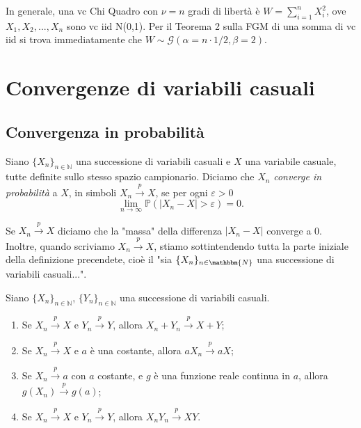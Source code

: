 In generale, una vc Chi Quadro con $\nu=n$ gradi di libertà è $W=\sum_{i=1}^n X_i^2$, ove $X_1,X_2,...,X_n$ sono vc iid N(0,1). Per il Teorema 2 sulla FGM di una somma di vc iid si trova immediatamente che $W \sim \mathcal{G}(\alpha=n \cdot 1/2,\beta=2)$.

\section{Convergenze di variabili casuali}

\subsection{Convergenza in probabilità}

\begin{dfn}
Siano \(\lbrace X_n\rbrace_{n\in\mathbb{N}}\) una successione di variabili
casuali e \(X\) una variabile casuale, tutte definite sullo stesso spazio
campionario. Diciamo che \(X_n\) \emph{converge in probabilità} a \(X\), in
simboli \(X_n\stackrel{p}{\rightarrow}X\), se per ogni \(\varepsilon > 0\)
\begin{equation}
  \lim_{n \to\infty} \mathbb{P}\left(\lvert X_n-X\rvert > \varepsilon\right)
  = 0.
\end{equation}
\end{dfn}
\begin{oss}
Se $X_n\stackrel{p}{\rightarrow}X$ diciamo che la "massa" della differenza $|X_n-X|$ converge a 0.
Inoltre, quando scriviamo $X_n\stackrel{p}{\rightarrow}X$, stiamo sottintendendo tutta la parte iniziale della definizione precendete, cioè il "sia $\{X_n\}_{n\in\mathbbm{N}}$ una successione di variabili casuali...".
\end{oss}

\begin{thm}
  Siano \(\lbrace X_n \rbrace_{n\in\mathbb{N}}\),
  \(\lbrace Y_n \rbrace_{n\in\mathbb{N}}\) una successione di variabili
  casuali.
  \begin{enumerate}
  \item Se \(X_n\stackrel{p}{\rightarrow}X\) e
        \(Y_n\stackrel{p}{\rightarrow}Y\), allora
        \(X_n+Y_n\stackrel{p}{\rightarrow}X+Y\);
  \item Se \(X_n\stackrel{p}{\rightarrow}X\) e \(a\) è una costante,
        allora \(aX_n\stackrel{p}{\rightarrow}aX\); 
  \item Se \(X_n\stackrel{p}{\rightarrow}a\) con \(a\) costante, e \(g\) è
        una funzione reale continua in \(a\), allora
        \(g(X_n)\stackrel{p}{\rightarrow}g(a)\);
  \item Se \(X_n\stackrel{p}{\rightarrow}X\) e
        \(Y_n\stackrel{p}{\rightarrow}Y\), allora
        \(X_nY_n\stackrel{p}{\rightarrow}XY\).
  \end{enumerate}
\end{thm}

